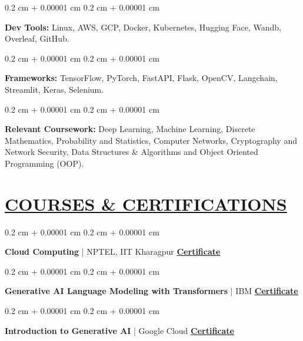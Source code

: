 \documentclass[10pt, letterpaper]{article}
\newenvironment{onecolentry}{
    \begin{adjustwidth}{
        0.2 cm + 0.00001 cm
    }{
        0.2 cm + 0.00001 cm
    }
}{
    \end{adjustwidth}
} %
\begin{document}
        \vspace{0.1 cm}

        \begin{onecolentry}
            \textbf{Dev Tools:} Linux, AWS, GCP, Docker, Kubernetes, Hugging Face, Wandb, Overleaf, GitHub.
        \end{onecolentry}
        
        \vspace{0.1 cm}

        \begin{onecolentry}
            \textbf{Frameworks:} TensorFlow, PyTorch, FastAPI, Flask, OpenCV, Langchain, Streamlit, Keras, Selenium.

        \end{onecolentry}
         \vspace{0.1 cm}

        \begin{onecolentry}
            \textbf{Relevant Coursework:} Deep Learning, Machine Learning,  Discrete Mathematics, Probability and Statistics, Computer Networks, Cryptography and Network Security, Data Structures \& Algorithms and Object Oriented Programming (OOP).

        \end{onecolentry}
         

\section{\href{https://www.harjot.info/\#Education}{COURSES \& CERTIFICATIONS}}

\begin{onecolentry}
    \textbf{Cloud Computing} | NPTEL, IIT Kharagpur
    \hfill \href{https://archive.nptel.ac.in/noc/Ecertificate/?q=NPTEL23CS89S54230011820182506}{\textbf{Certificate}}
\end{onecolentry}

\vspace{0.04cm}

\begin{onecolentry}
    \textbf{Generative AI Language Modeling with Transformers} | IBM
    \hfill \href{https://coursera.org/share/ee8a77455390270956277a2c6f41b1f1}{\textbf{Certificate}}
\end{onecolentry}

\vspace{0.04cm}
\begin{onecolentry}
    \textbf{Introduction to Generative AI} | Google Cloud
    \hfill \href{https://coursera.org/share/3e21bb2fa9795f31283d4193b29809c5}{\textbf{Certificate}}
\end{onecolentry}
\end{document}
